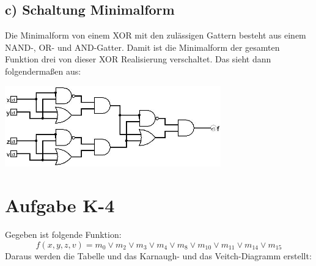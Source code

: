 \documentclass[11pt]{scrartcl}
\begin{document}
\subsection{c) Schaltung Minimalform}

Die Minimalform von einem XOR mit den zulässigen Gattern besteht aus einem NAND-, OR- und AND-Gatter.
Damit ist die Minimalform der gesamten Funktion drei von dieser XOR Realisierung verschaltet. Das sieht
dann folgendermaßen aus:
\begin{center}
    \includegraphics[width=0.7\textwidth]{../Aufgabe_K-2/Schaltung/Aufgabe_K-2.jpg}
\end{center}



\newpage
\section{Aufgabe K-4}

Gegeben ist folgende Funktion:
\[f(x,y,z,v) = m_0 \lor m_2 \lor m_3 \lor m_4 \lor m_8 \lor m_{10} \lor m_{11} \lor m_{14} \lor m_{15}\]
Daraus werden die Tabelle und das Karnaugh- und das Veitch-Diagramm erstellt:
\end{document}
